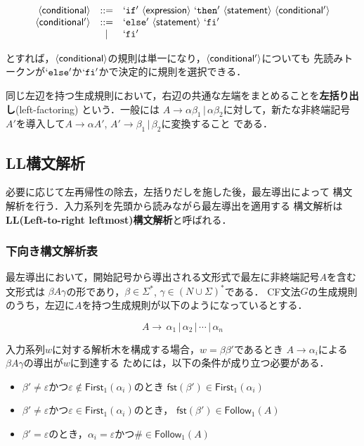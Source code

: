 \documentclass[a4j,dvipdfmx]{jbook}
\begin{document}
\[\begin{array}{rcl}
    \NTerm{conditional}  & \mathtt{::=} & \Term{if}\ \NTerm{expression}\ \Term{then}\ \NTerm{statement}\ \NTerm{conditional'} \\
    \NTerm{conditional'} & \mathtt{::=} & \Term{else}\ \NTerm{statement}\ \Term{fi}                                           \\
                         & |            & \Term{fi}
  \end{array}\]

とすれば，$\langle{\mbox{$\mathsf{conditional}$}}\rangle$の規則は単一になり，$\langle{\mbox{$\mathsf{conditional'}$}}\rangle$についても
先読みトークンが$`\mbox{$\mathtt{else}$}'$か$`\mbox{$\mathtt{fi}$}'$かで決定的に規則を選択できる．

同じ左辺を持つ生成規則において，右辺の共通な左端をまとめることを{\bf 左括り出し}(left-factoring)
という．一般には $A\rightarrow \alpha\beta_1\,|\,\alpha\beta_2$に対して，新たな非終端記号
$A'$を導入して$A\rightarrow \alpha A'$, $A'\rightarrow\beta_1\,|\,\beta_2$に変換すること
である．

\subsection{LL構文解析}

必要に応じて左再帰性の除去，左括りだしを施した後，最左導出によって
構文解析を行う．入力系列を先頭から読みながら最左導出を適用する
構文解析は{\bf LL(Left-to-right leftmost)構文解析}と呼ばれる．

\subsubsection{下向き構文解析表}

最左導出において，開始記号から導出される文形式で最左に非終端記号$A$を含む文形式は
$\beta A\gamma$の形であり，$\beta\in\Sigma^\ast$, $\gamma\in(N\cup\Sigma)^\ast$である．
CF文法$G$の生成規則のうち，左辺に$A$を持つ生成規則が以下のようになっているとする．

\[A\rightarrow\,\alpha_1\,|\,\alpha_2\,|\,\cdots\,|\,\alpha_n\]

入力系列$w$に対する解析木を構成する場合，$w=\beta\beta'$であるとき
$A\rightarrow\alpha_i$による$\beta A\gamma$の導出が$w$に到達する
ためには，以下の条件が成り立つ必要がある．

\begin{itemize}
  \item $\beta'\not=\varepsilon$かつ$\varepsilon\notin\mathsf{First}_1(\alpha_i)$のとき
        $\mathsf{fst}(\beta')\in\mathsf{First}_1(\alpha_i)$
  \item $\beta'\not=\varepsilon$かつ$\varepsilon\in\mathsf{First}_1(\alpha_i)$のとき，
        $\mathsf{fst}(\beta')\in\mathsf{Follow}_1(A)$
  \item $\beta'=\varepsilon$のとき，$\alpha_i=\varepsilon$かつ$\#\in\mathsf{Follow}_1(A)$
\end{itemize}
\end{document}
